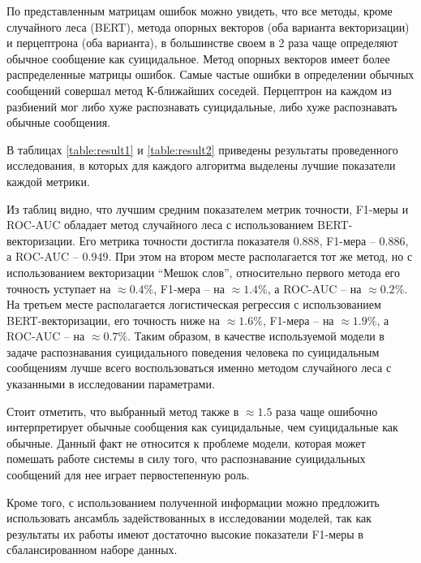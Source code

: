 По представленным матрицам ошибок можно увидеть, что все методы, кроме случайного леса (BERT), метода опорных векторов (оба варианта векторизации) и перцептрона (оба варианта), в большинстве своем в 2 раза чаще определяют обычное сообщение как суицидальное. Метод опорных векторов имеет более распределенные матрицы ошибок. Самые частые ошибки в определении обычных сообщений совершал метод К-ближайших соседей. Перцептрон на каждом из разбиений мог либо хуже распознавать суицидальные, либо хуже распознавать обычные сообщения.

В таблицах \ref{table:result1} и \ref{table:result2} приведены результаты проведенного исследования, в которых для каждого алгоритма выделены лучшие показатели каждой метрики.

Из таблиц видно, что лучшим средним показателем метрик точности, F1-меры и ROC-AUC обладает метод случайного леса с использованием BERT-векторизации.
Его метрика точности достигла показателя $0.888$, F1-мера -- $0.886$, а ROC-AUC -- $0.949$.
При этом на втором месте располагается тот же метод, но с использованием векторизации ``Мешок слов'', относительно первого метода его точность уступает на $\approx 0.4\%$, F1-мера -- на $\approx 1.4\%$, а ROC-AUC -- на $\approx 0.2\%$. 
На третьем месте располагается логистическая регрессия с использованием BERT-векторизации, его точность ниже на $\approx 1.6\%$, F1-мера -- на $\approx 1.9\%$, а ROC-AUC -- на $\approx 0.7\%$. 
Таким образом, в качестве используемой модели в задаче распознавания суицидального поведения человека по суицидальным сообщениям лучше всего воспользоваться именно методом случайного леса с указанными в исследовании параметрами.

Стоит отметить, что выбранный метод также в $\approx 1.5$ раза чаще ошибочно интерпретирует обычные сообщения как суицидальные, чем суицидальные как обычные. Данный факт не относится к проблеме модели, которая может помешать работе системы в силу того, что распознавание суицидальных сообщений для нее играет первостепенную роль.

Кроме того, с использованием полученной информации можно предложить использовать ансамбль задействованных в исследовании моделей, так как результаты их работы имеют достаточно высокие показатели F1-меры в сбалансированном наборе данных.

